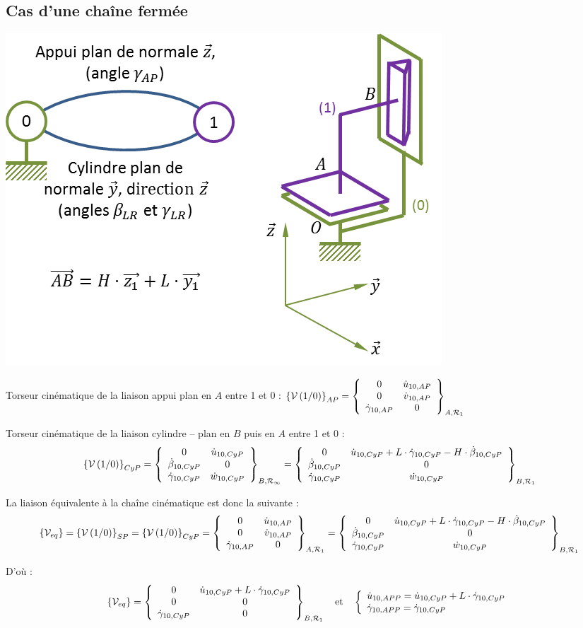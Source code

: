 \documentclass[10pt]{article}
\begin{document}
\subsection{Cas d'une chaîne fermée}


\begin{exemple}
\begin{center}
\includegraphics[width=.6\textwidth]{images/chs1}
\end{center}
\end{exemple}

\noindent\colorbox{grisf}{}

Torseur cinématique de la liaison appui plan en $A$ entre 1 et 0 : 
$\torseurcin{V}{1}{0}_{AP}=\torseurcol{0}{0}{\dot{\gamma}_{10,AP}}{\dot{u}_{10,AP}}{\dot{v}_{10,AP}}{0}{A,\mathcal{R}_1}$

Torseur cinématique de la liaison cylindre -- plan en $B$ puis en $A$ entre 1 et 0 :
$$\torseurcin{V}{1}{0}_{CyP}
=\torseurcol{0}{\dot{\beta}_{10,CyP}}{\dot{\gamma}_{10,CyP}}{\dot{u}_{10,CyP}}{0}{\dot{w}_{10,CyP}}{B,\mathcal{R_1}}
=\torseurcol{0}{\dot{\beta}_{10,CyP}}{\dot{\gamma}_{10,CyP}}{\dot{u}_{10,CyP}+L\cdot\dot{\gamma}_{10,CyP} -H\cdot\dot{\beta}_{10,CyP}}{0}{\dot{w}_{10,CyP}}{B,\mathcal{R}_1}
$$

La liaison équivalente à la chaîne cinématique est donc la suivante : 
$$\{\mathcal{V}_{eq}\}=\torseurcin{V}{1}{0}_{SP}=\torseurcin{V}{1}{0}_{CyP}
=
\torseurcol{0}{0}{\dot{\gamma}_{10,AP}}{\dot{u}_{10,AP}}{\dot{v}_{10,AP}}{0}{A,\mathcal{R}_1}
=\torseurcol{0}{\dot{\beta}_{10,CyP}}{\dot{\gamma}_{10,CyP}}{\dot{u}_{10,CyP}+L\cdot\dot{\gamma}_{10,CyP} -H\cdot\dot{\beta}_{10,CyP}}{0}{\dot{w}_{10,CyP}}{B,\mathcal{R}_1}
$$

D'où :
$$\{\mathcal{V}_{eq}\}
=\torseurcol{0}{0}{\dot{\gamma}_{10,CyP}}{\dot{u}_{10,CyP}+L\cdot\dot{\gamma}_{10,CyP}}{0}{0}{B,\mathcal{R}_1}
\quad
\text{et}
\quad
\left\{
\begin{array}{l}
\dot{u}_{10,APP}=\dot{u}_{10,CyP}+L\cdot\dot{\gamma}_{10,CyP}\\
\dot{\gamma}_{10,APP}=\dot{\gamma}_{10,CyP}
\end{array}
\right.
$$
\end{document}
